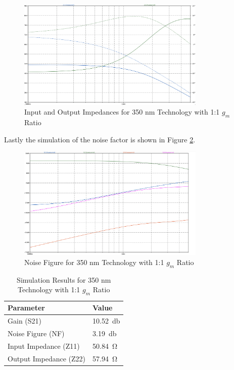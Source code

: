 \begin{figure}[H]
    \centering
    \includegraphics[width=0.8\textwidth]{Images/3501to1ZParam.png}
    \caption{Input and Output Impedances for 350 nm Technology with 1:1 $g_m$ Ratio}
    \label{fig:350nm_1to1-Z}
\end{figure}

Lastly the simulation of the noise factor is shown in Figure \ref{fig:350nm_1to1-NF}.
\begin{figure}[H]
    \centering
    \includegraphics[width=0.8\textwidth]{Images/3501to1SParam.png}
    \caption{Noise Figure for 350 nm Technology with 1:1 $g_m$ Ratio}
    \label{fig:350nm_1to1-NF}
\end{figure}

\begin{table}[H]
    \centering
    \caption{Simulation Results for 350 nm Technology with 1:1 $g_m$ Ratio}
    \begin{tabularx}{\textwidth}{>{\centering\arraybackslash}X >{\centering\arraybackslash}X }
        \toprule
        \textbf{Parameter} & \textbf{Value}\\
        \midrule
        Gain (S21) & \SI{10.52}{\decibel} \\
        \midrule
        Noise Figure (NF) & \SI{3.19}{\decibel} \\
        \midrule
        Input Impedance (Z11) & \SI{50.84}{\ohm} \\
        \midrule
        Output Impedance (Z22) & \SI{57.94}{\ohm} \\
        \bottomrule
    \end{tabularx}
    \label{tab:350nm_1to1_results}
\end{table}
